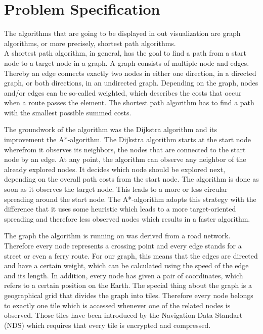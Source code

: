 \documentclass
[
	paper = a4,
    pagesize,
	12 pt,
	oneside,                       %
    open = right,
	DIV = calc,
	BCOR = 0 mm,                   %
	bibtotoc
]
{scrbook}
\begin{document}
\section{Problem Specification} \label{specification}

The algorithms that are going to be displayed in out visualization are graph algorithms, or more precisely, shortest path algorithms.\\
A shortest path algorithm, in general, has the goal to find a path from a start node to a target node in a graph.
A graph consists of multiple node and edges.
Thereby an edge connects exactly two nodes in either one direction, in a directed graph, or both directions, in an undirected graph.
Depending on the graph, nodes and/or edges can be so-called weighted, which describes the costs that occur when a route passes the element.
The shortest path algorithm has to find a path with the smallest possible summed costs.

\par The groundwork of the algorithm was the Dijkstra algorithm and its improvement the A*-algorithm.
The Dijkstra algorithm starts at the start node wherefrom it observes its neighbors, the nodes that are connected to the start node by an edge.
At any point, the algorithm can observe any neighbor of the already explored nodes.
It decides which node should be explored next, depending on the overall path costs from the start node.
The algorithm is done as soon as it observes the target node.
This leads to a more or less circular spreading around the start node.
The A*-algorithm adopts this strategy with the difference that it uses some heuristic which leads to a more target-oriented spreading and therefore less observed nodes which results in a faster algorithm.

\par The graph the algorithm is running on was derived from a road network.
Therefore every node represents a crossing point and every edge stands for a street or even a ferry route.
For our graph, this means that the edges are directed and have a certain weight, which can be calculated using the speed of the edge and its length.
In addition, every node has given a pair of coordinates, which refers to a certain position on the Earth.
The special thing about the graph is a geographical grid that divides the graph into tiles.
Therefore every node belongs to exactly one tile which is accessed whenever one of the related nodes is observed.
Those tiles have been introduced by the Navigation Data Standart (NDS) which requires that every tile is encrypted and compressed.
\end{document}
